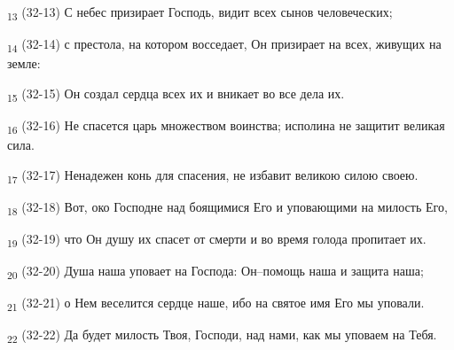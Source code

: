 \begin{tcolorbox}
\textsubscript{13} (32-13) С небес призирает Господь, видит всех сынов человеческих;
\end{tcolorbox}
\begin{tcolorbox}
\textsubscript{14} (32-14) с престола, на котором восседает, Он призирает на всех, живущих на земле:
\end{tcolorbox}
\begin{tcolorbox}
\textsubscript{15} (32-15) Он создал сердца всех их и вникает во все дела их.
\end{tcolorbox}
\begin{tcolorbox}
\textsubscript{16} (32-16) Не спасется царь множеством воинства; исполина не защитит великая сила.
\end{tcolorbox}
\begin{tcolorbox}
\textsubscript{17} (32-17) Ненадежен конь для спасения, не избавит великою силою своею.
\end{tcolorbox}
\begin{tcolorbox}
\textsubscript{18} (32-18) Вот, око Господне над боящимися Его и уповающими на милость Его,
\end{tcolorbox}
\begin{tcolorbox}
\textsubscript{19} (32-19) что Он душу их спасет от смерти и во время голода пропитает их.
\end{tcolorbox}
\begin{tcolorbox}
\textsubscript{20} (32-20) Душа наша уповает на Господа: Он--помощь наша и защита наша;
\end{tcolorbox}
\begin{tcolorbox}
\textsubscript{21} (32-21) о Нем веселится сердце наше, ибо на святое имя Его мы уповали.
\end{tcolorbox}
\begin{tcolorbox}
\textsubscript{22} (32-22) Да будет милость Твоя, Господи, над нами, как мы уповаем на Тебя.
\end{tcolorbox}
